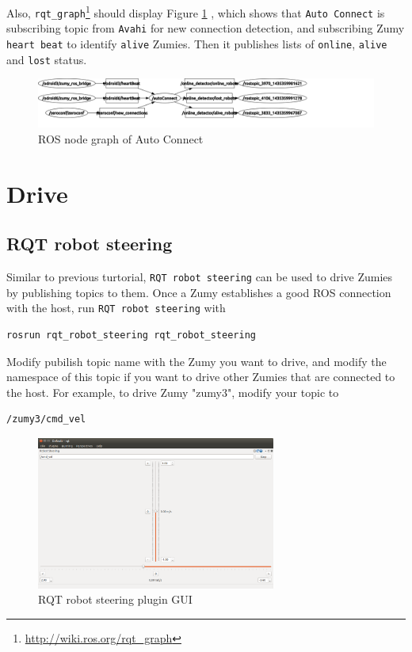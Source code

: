 \documentclass{article}
\begin{document}
Also, \verb=rqt_graph=\footnote{\url{http://wiki.ros.org/rqt_graph}} should display Figure \ref{fig:auto_connect} , which shows that \verb=Auto Connect= is subscribing topic from \verb=Avahi= for new connection detection, and subscribing Zumy \verb=heart beat= to identify \verb=alive= Zumies. Then it publishes lists of \verb=online=, \verb=alive= and \verb=lost= status. 
\begin{figure}[h]
\centering
\includegraphics[width=1.3\textwidth]{img/auto_connect.png}
\caption{ROS node graph of Auto Connect}
\label{fig:auto_connect}
\end{figure}


\section{Drive}
\subsection{RQT robot steering}

Similar to previous turtorial, \verb=RQT robot steering= can be used to drive Zumies by publishing topics to them. Once a Zumy establishes a good ROS connection with the host, run \verb=RQT robot steering= with

\begin{Verbatim}[frame=single]
rosrun rqt_robot_steering rqt_robot_steering
\end{Verbatim} 
Modify pubilish topic name with the Zumy you want to drive, and modify the namespace of this topic if you want to drive other Zumies that are connected to the host. For example, to drive Zumy "zumy3", modify your topic to 

\begin{Verbatim}[frame=single]
/zumy3/cmd_vel
\end{Verbatim}

\begin{figure}[h]
\centering
\includegraphics[width=0.7\textwidth]{img/rqt_robot_steering.png}
\caption{RQT robot steering plugin GUI}
\label{fig:robot_steering}
\end{figure}
\end{document}
